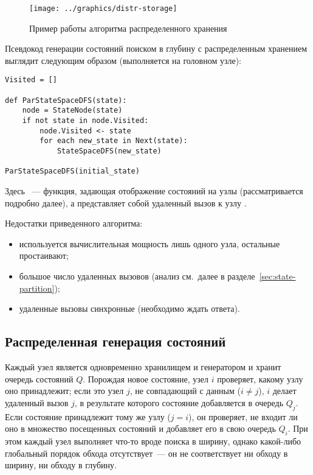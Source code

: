 \begin{figure}[!htb]
  \centering 
  \texttt{[image: ../graphics/distr-storage]}
  \caption{Пример работы алгоритма распределенного хранения}
  \label{fig:distr-storage}
\end{figure}

Псевдокод генерации состояний поиском в глубину с распределенным хранением выглядит
следующим образом (выполняется на головном узле):

\begin{lstlisting}[style=pseudocode]
Visited = []

def ParStateSpaceDFS(state):
    node = StateNode(state)
    if not state in node.Visited:
        node.Visited <- state
        for each new_state in Next(state):
            StateSpaceDFS(new_state)

ParStateSpaceDFS(initial_state)
\end{lstlisting}

Здесь ~--- функция, задающая отображение состояний на узлы (рассматривается
подробно далее), а  представляет собой удаленный вызов к узлу
.

Недостатки приведенного алгоритма:
\begin{itemize}
\item используется вычислительная мощность лишь одного узла, остальные простаивают;
\item большое число удаленных вызовов (анализ см.~далее в
  разделе~\ref{sec:state-partition});
\item удаленные вызовы синхронные (необходимо ждать ответа).
\end{itemize}

\subsection{Распределенная генерация состояний}
\label{sec:distr-generation}

Каждый узел является одновременно хранилищем и генератором и хранит очередь состояний
$Q$. Порождая новое состояние, узел $i$ проверяет, какому узлу оно принадлежит; если это
узел $j$, не совпадающий с данным ($i \neq j$), $i$ делает удаленный вызов $j$, в
результате которого состояние добавляется в очередь $Q_j$. Если состояние принадлежит тому
же узлу ($j = i$), он проверяет, не входит ли оно в множество посещенных состояний
 и добавляет его в свою очередь $Q_i$. При этом каждый узел выполняет что-то
вроде поиска в ширину, однако какой-либо глобальный порядок обхода отсутствует~--- он не
соответствует ни обходу в ширину, ни обходу в глубину.

